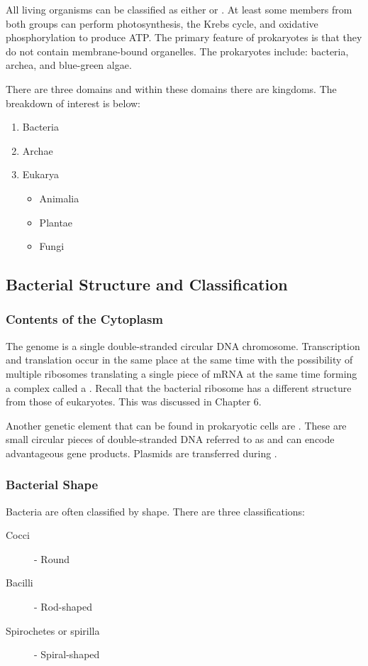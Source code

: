 \documentclass[../Bio_chemistryReview.tex]{subfiles}
\begin{document}
All living organisms can be classified as either  or
. At least some members from both groups can perform
photosynthesis, the Krebs cycle, and oxidative phosphorylation to produce ATP.
The primary feature of prokaryotes is that they do not contain membrane-bound
organelles. The prokaryotes include: bacteria, archea, and blue-green algae.\par

There are three domains and within these domains there are kingdoms. The
breakdown of interest is below:
\begin{enumerate}
    \item Bacteria
    \item Archae
    \item Eukarya
        \begin{itemize}
            \item Animalia
            \item Plantae
            \item Fungi
        \end{itemize}
\end{enumerate}

\subsection{Bacterial Structure and Classification}
\subsubsection{Contents of the Cytoplasm}
The genome is a single double-stranded circular DNA chromosome. Transcription
and translation occur in the same place at the same time with the possibility of
multiple ribosomes translating a single piece of mRNA at the same time forming a
complex called a . Recall that the bacterial ribosome has
a different structure from those of eukaryotes. This was discussed in Chapter
6.\par

Another genetic element that can be found in prokaryotic cells are
. These are small circular pieces of double-stranded DNA
referred to as  and can encode
advantageous gene products. Plasmids are transferred during
.

\subsubsection{Bacterial Shape}
Bacteria are often classified by shape. There are three classifications:
\begin{description}
    \item[Cocci] - Round 
    \item[Bacilli] - Rod-shaped 
    \item[Spirochetes or spirilla] - Spiral-shaped 
\end{description}
\end{document}

